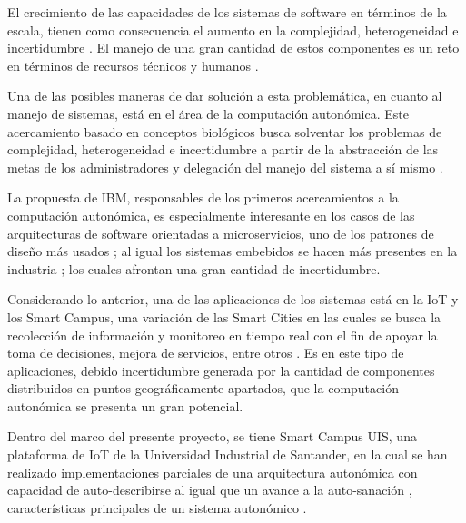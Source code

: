 \documentclass[12pt]{article}
\begin{document}

    El crecimiento de las capacidades de los sistemas de software en términos de la escala, tienen como consecuencia el aumento en la complejidad, heterogeneidad e incertidumbre \cite{emerging_2005}. El manejo de una gran cantidad de estos componentes es un reto en términos de recursos técnicos y humanos \cite[pp.~4-5]{horn_2001}. 
    
    Una de las posibles maneras de dar solución a esta problemática, en cuanto al manejo de sistemas, está en el área de la computación autonómica. Este acercamiento basado en conceptos biológicos busca solventar los problemas de complejidad, heterogeneidad e incertidumbre \cite{emerging_2005} a partir de la abstracción de las metas de los administradores y delegación del manejo del sistema a sí mismo \cite{lalanda_diaconescu_mccann_2014}.
    
    La propuesta de IBM, responsables de los primeros acercamientos a la computación autonómica, es especialmente interesante en los casos de las arquitecturas de software orientadas a microservicios, uno de los patrones de diseño más usados \cite{forrester_research_2019}; al igual los sistemas embebidos se hacen más presentes en la industria \cite{deichmann_2022}; los cuales afrontan una gran cantidad de incertidumbre. 
    
    Considerando lo anterior, una de las aplicaciones de los sistemas está en la IoT y los Smart Campus, una variación de las Smart Cities en las cuales se busca la recolección de información y monitoreo en tiempo real con el fin de apoyar la toma de decisiones, mejora de servicios, entre otros \cite{MinAllah2020}. Es en este tipo de aplicaciones, debido incertidumbre generada por la cantidad de componentes distribuidos en puntos geográficamente apartados, que la computación autonómica se presenta un gran potencial. 

    Dentro del marco del presente proyecto, se tiene Smart Campus UIS, una plataforma de IoT de la Universidad Industrial de Santander, en la cual se han realizado implementaciones parciales de una arquitectura autonómica con capacidad de auto-describirse al igual que un avance a la auto-sanación \cite{henry_2020}, características principales de un sistema autonómico \cite{horn_2001}. 
    
\end{document}
